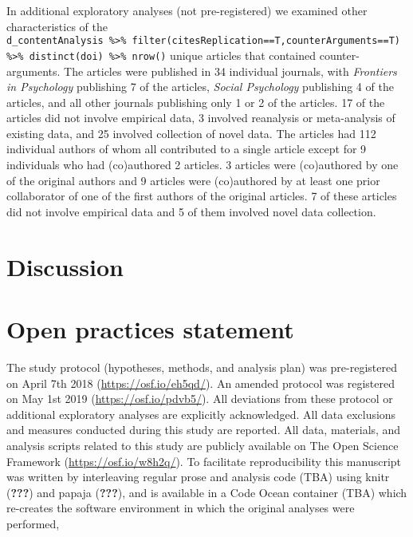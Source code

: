 \documentclass[
  american,
  ,man,floatsintext]{apa6}
\begin{document}
In additional exploratory analyses (not pre-registered) we examined other characteristics of the \texttt{d\_contentAnalysis\ \%\textgreater{}\%\ filter(citesReplication==T,counterArguments==T)\ \%\textgreater{}\%\ distinct(doi)\ \%\textgreater{}\%\ nrow()} unique articles that contained counter-arguments. The articles were published in 34 individual journals, with \emph{Frontiers in Psychology} publishing 7 of the articles, \emph{Social Psychology} publishing 4 of the articles, and all other journals publishing only 1 or 2 of the articles. 17 of the articles did not involve empirical data, 3 involved reanalysis or meta-analysis of existing data, and 25 involved collection of novel data. The articles had 112 individual authors of whom all contributed to a single article except for 9 individuals who had (co)authored 2 articles. 3 articles were (co)authored by one of the original authors and 9 articles were (co)authored by at least one prior collaborator of one of the first authors of the original articles. 7 of these articles did not involve empirical data and 5 of them involved novel data collection.

\hypertarget{discussion}{%
\section{Discussion}\label{discussion}}

\hypertarget{open-practices-statement}{%
\section{Open practices statement}\label{open-practices-statement}}

The study protocol (hypotheses, methods, and analysis plan) was pre-registered on April 7th 2018 (\url{https://osf.io/eh5qd/}). An amended protocol was registered on May 1st 2019 (\url{https://osf.io/pdvb5/}). All deviations from these protocol or additional exploratory analyses are explicitly acknowledged. All data exclusions and measures conducted during this study are reported. All data, materials, and analysis scripts related to this study are publicly available on The Open Science Framework (\url{https://osf.io/w8h2q/}). To facilitate reproducibility this manuscript was written by interleaving regular prose and analysis code (TBA) using knitr ({\textbf{???}}) and papaja ({\textbf{???}}), and is available in a Code Ocean container (TBA) which re-creates the software environment in which the original analyses were performed,
\end{document}
